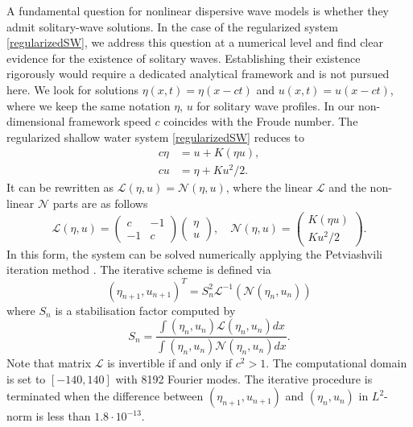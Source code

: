 \documentclass[reqno,12pt,a4paper]{article}
\theoremstyle{plain}
\begin{document}
A fundamental question for nonlinear dispersive wave models
is whether they admit solitary-wave solutions.
In the case of the regularized system \eqref{regularizedSW},
we address this question at a numerical level
and find clear evidence for the existence of solitary waves.
Establishing their existence rigorously would require a dedicated analytical framework
and is not pursued here. 
We look for solutions $\eta(x, t) = \eta(x - ct)$
and $u(x, t) = u(x - ct)$,
where we keep the same notation
$\eta$, $u$ for solitary wave profiles.
In our non-dimensional framework
speed $c$ coincides with the Froude number.
The regularized shallow water system \eqref{regularizedSW}
reduces to
%
\begin{align}
\label{solitary_sys1}
	c\eta &=
	u + K (\eta u)
	, \\
\label{solitary_sys2}
	cu &=
	\eta + K u^2 / 2
	.
\end{align}
%
It can be rewritten as $\mathcal L(\eta, u) = \mathcal N(\eta, u)$,
where
the linear $\mathcal L$ and the non-linear $\mathcal N$ parts
are as follows
%
\[
	\mathcal L(\eta, u)
	=
	\begin{pmatrix}
		c & -1
		\\
		- 1 & c
	\end{pmatrix}
	\begin{pmatrix}
		\eta
		\\
		u
	\end{pmatrix}
	, \quad
	\mathcal N(\eta, u)
	=
	\begin{pmatrix}
		K (\eta u)
		\\
		K u^2 / 2
	\end{pmatrix}
	.
\]
%
In this form, the system can be solved numerically
applying the Petviashvili iteration method
\cite{Clamond_Dutykh2013}.
The iterative scheme is defined via
%
\[
	( \eta_{n+1}, u_{n+1} )^T
	=
	S_n^2 \mathcal L^{-1}( \mathcal N( \eta_n, u_n ) )
\]
%
where $S_n$ is a stabilisation factor computed by
%
\[
	S_n = \frac
	{ \int ( \eta_n, u_n ) \mathcal L( \eta_n, u_n ) dx }
	{ \int ( \eta_n, u_n ) \mathcal N( \eta_n, u_n ) dx }
	.
\]
Note that matrix $\mathcal L$
is invertible if and only if
$c^2 > 1$.
The computational domain is set to $[-140, 140]$
with 8192 Fourier modes.
The iterative procedure
is terminated when the difference
between
\(
	( \eta_{n+1}, u_{n+1} )
\)
and
\(
	( \eta_{n}, u_{n} )
\)
in $L^2$-norm is less than $1.8 \cdot 10^{-13}$.
\end{document}
